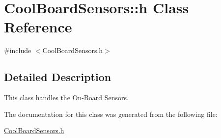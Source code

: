 \hypertarget{class_cool_board_sensors_1_1h}{}\section{Cool\+Board\+Sensors\+:\+:h Class Reference}
\label{class_cool_board_sensors_1_1h}


{\ttfamily \#include $<$Cool\+Board\+Sensors.\+h$>$}



\subsection{Detailed Description}
This class handles the On-\/\+Board Sensors. 

The documentation for this class was generated from the following file\+:\begin{DoxyCompactItemize}
\item 
\hyperlink{_cool_board_sensors_8h}{Cool\+Board\+Sensors.\+h}\end{DoxyCompactItemize}
